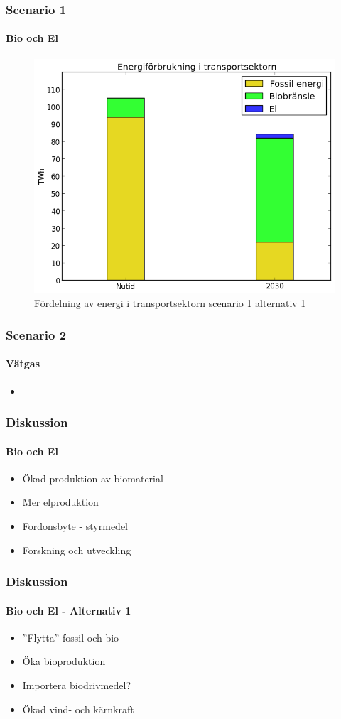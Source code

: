 \documentclass{beamer}
\begin{document}
\begin{frame}
	\frametitle{Scenario 1}
	\framesubtitle{Bio och El}
	\begin{figure}[h!]
       \centering
       \includegraphics[scale=0.5]{scen1a1transport.png}
       \caption{Fördelning av energi i transportsektorn scenario 1 alternativ 1}
	\end{figure}
\end{frame}

\begin{frame}
	\frametitle{Scenario 2}
	\framesubtitle{Vätgas}
	\begin{itemize}
		\item 
	\end{itemize}
\end{frame}

\begin{frame}
	\frametitle{Diskussion}
	\framesubtitle{Bio och El}
	\begin{itemize}
		\item Ökad produktion av biomaterial
		\item Mer elproduktion
		\item Fordonsbyte - styrmedel
		\item Forskning och utveckling
	\end{itemize}
\end{frame}

\begin{frame}
	\frametitle{Diskussion}
	\framesubtitle{Bio och El - Alternativ 1}
	\begin{itemize}
		\item{''Flytta'' fossil och bio}
		\item{Öka bioproduktion}
		\item{Importera biodrivmedel?}
		\item{Ökad vind- och kärnkraft}
	\end{itemize}
\end{frame}
\end{document}
